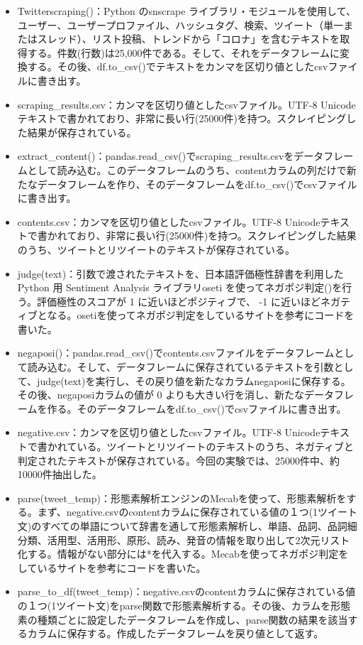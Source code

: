 \documentclass[a4paper, 11pt, titlepage]{jsarticle}
\begin{document}
\begin{itemize}
  \item Twitterscraping()：Python のsnscrape ライブラリ・モジュールを使用して、ユーザー、ユーザープロファイル、ハッシュタグ、検索、ツイート（単一またはスレッド）、リスト投稿、トレンドから「コロナ」を含むテキストを取得する。件数(行数)は25,000件である。そして、それをデータフレームに変換する\cite{snscrape1}。その後、df.to\_csv()でテキストをカンマを区切り値としたcsvファイルに書き出す\cite{snscrape2}。
  \item scraping\_results.csv：カンマを区切り値としたcsvファイル。UTF-8 Unicodeテキストで書かれており、非常に長い行(25000件)を持つ。スクレイピングした結果が保存されている。
  \item extract\_content()：pandas.read\_csv()でscraping\_results.csvをデータフレームとして読み込む\cite{snscrape3}。このデータフレームのうち、contentカラムの列だけで新たなデータフレームを作り、そのデータフレームをdf.to\_csv()でcsvファイルに書き出す。
  \item contents.csv：カンマを区切り値としたcsvファイル。UTF-8 Unicodeテキストで書かれており、非常に長い行(25000件)を持つ。スクレイピングした結果のうち、ツイートとリツイートのテキストが保存されている。
  \item judge(text)：引数で渡されたテキストを、日本語評価極性辞書を利用したPython 用 Sentiment Analysis ライブラリoseti を使ってネガポジ判定()を行う\cite{negaposi1}。評価極性のスコアが 1 に近いほどポジティブで、 -1 に近いほどネガティブとなる。osetiを使ってネガポジ判定をしているサイトを参考にコードを書いた\cite{negaposi2}。
  \item negaposi()：pandas.read\_csv()でcontents.csvファイルをデータフレームとして読み込む。そして、データフレームに保存されているテキストを引数として、judge(text)を実行し、その戻り値を新たなカラムnegaposiに保存する。その後、negaposiカラムの値が 0 よりも大きい行を消し、新たなデータフレームを作る。そのデータフレームをdf.to\_csv()でcsvファイルに書き出す。
  \item negative.csv：カンマを区切り値としたcsvファイル。UTF-8 Unicodeテキストで書かれている。ツイートとリツイートのテキストのうち、ネガティブと判定されたテキストが保存されている。今回の実験では、25000件中、約10000件抽出した。
  \item parse(tweet\_temp)：形態素解析エンジンのMecabを使って、形態素解析をする\cite{keitaiso1}。まず、negative.csvのcontentカラムに保存されている値の１つ(1ツイート文)のすべての単語について辞書を通して形態素解析し、単語、品詞、品詞細分類、活用型、活用形、原形、読み、発音の情報を取り出して2次元リスト化する。情報がない部分には*を代入する。Mecabを使ってネガポジ判定をしているサイトを参考にコードを書いた\cite{keitaiso2}。
  \item parse\_to\_df(tweet\_temp)：negative.csvのcontentカラムに保存されている値の１つ(1ツイート文)をparse関数で形態素解析する。その後、カラムを形態素の種類ごとに設定したデータフレームを作成し、parse関数の結果を該当するカラムに保存する。作成したデータフレームを戻り値として返す。
\end{itemize}
\end{document}
